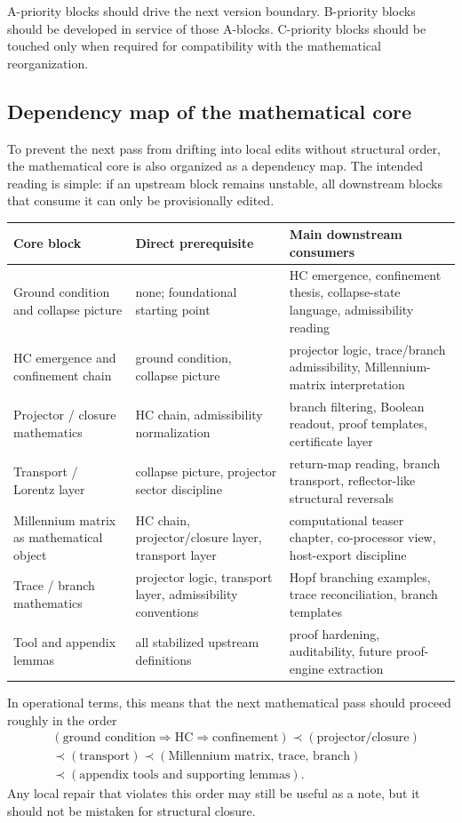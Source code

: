 A-priority blocks should drive the next version boundary. B-priority blocks should be developed in service of those A-blocks. C-priority blocks should be touched only when required for compatibility with the mathematical reorganization.

\subsection*{Dependency map of the mathematical core}
To prevent the next pass from drifting into local edits without structural order, the mathematical core is also organized as a dependency map. The intended reading is simple: if an upstream block remains unstable, all downstream blocks that consume it can only be provisionally edited.
\begin{center}
\begin{tabular}{p{}p{}p{}}
\toprule
\textbf{Core block} & \textbf{Direct prerequisite} & \textbf{Main downstream consumers}\\
\midrule
Ground condition and collapse picture & none; foundational starting point & HC emergence, confinement thesis, collapse-state language, admissibility reading\\
HC emergence and confinement chain & ground condition, collapse picture & projector logic, trace/branch admissibility, Millennium-matrix interpretation\\
Projector / closure mathematics & HC chain, admissibility normalization & branch filtering, Boolean readout, proof templates, certificate layer\\
Transport / Lorentz layer & collapse picture, projector sector discipline & return-map reading, branch transport, reflector-like structural reversals\\
Millennium matrix as mathematical object & HC chain, projector/closure layer, transport layer & computational teaser chapter, co-processor view, host-export discipline\\
Trace / branch mathematics & projector logic, transport layer, admissibility conventions & Hopf branching examples, trace reconciliation, branch templates\\
Tool and appendix lemmas & all stabilized upstream definitions & proof hardening, auditability, future proof-engine extraction\\
\bottomrule
\end{tabular}
\end{center}

In operational terms, this means that the next mathematical pass should proceed roughly in the order
\[
\begin{aligned}
&(\text{ground condition} \Rightarrow \text{HC} \Rightarrow \text{confinement}) \prec (\text{projector/closure})\\
&\prec (\text{transport}) \prec (\text{Millennium matrix, trace, branch})\\
&\prec (\text{appendix tools and supporting lemmas}).
\end{aligned}
\]
Any local repair that violates this order may still be useful as a note, but it should not be mistaken for structural closure.


